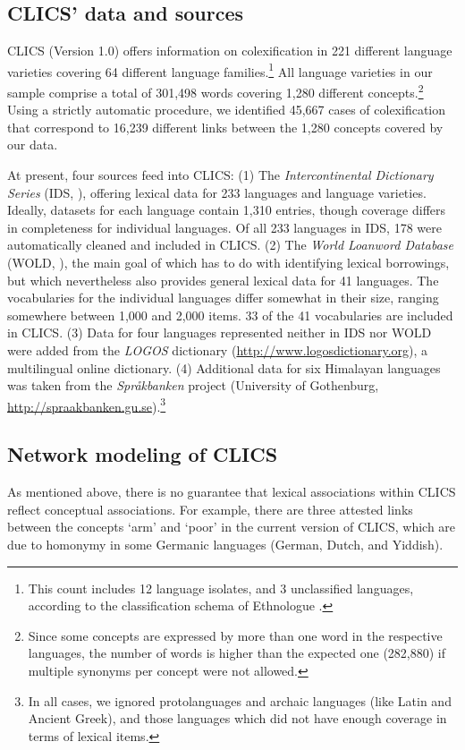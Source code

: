 \subsection{CLICS' data and sources}
CLICS (Version 1.0) offers information on colexification in 221 different language varieties
covering 64 different language families.\footnote{This count includes 12 language isolates, and 3
unclassified languages, according to the classification schema of Ethnologue \cite{Lewis2013}.} All language
varieties in our sample comprise a total of 301,498 words covering 1,280 different
concepts.\footnote{Since some concepts are expressed by more than one word in the respective
languages, the number of words is higher than the expected one (282,880) if multiple synonyms per
concept were not allowed.} Using a strictly automatic procedure, we identified 45,667 cases of
colexification that correspond to 16,239 different links between the 1,280 concepts covered by our
data. 

At present, four sources feed into CLICS: (1) The \emph{Intercontinental Dictionary Series} (IDS,
), offering lexical data for 233 languages and language varieties.
Ideally, datasets for each language contain 1,310 entries, though coverage differs in completeness
for individual languages. Of all 233 languages in IDS, 178 were automatically cleaned and included
in CLICS. (2) The \emph{World Loanword Database} (WOLD, ), the main goal
of which has to do with identifying lexical borrowings, but which nevertheless also provides general
lexical data for 41 languages. The vocabularies for the individual languages differ somewhat in
their size, ranging somewhere between 1,000 and 2,000 items. 33 of the 41 vocabularies are included
in CLICS.  (3) Data for four languages represented neither in IDS nor WOLD were added from the
\emph{LOGOS} dictionary (\url{http://www.logosdictionary.org}), a multilingual online dictionary.
(4) Additional data for six Himalayan languages was taken from the \emph{Spr\aa kbanken} project
(University of Gothenburg, \url{http://spraakbanken.gu.se}).\footnote{In all cases, we ignored
protolanguages and archaic languages (like Latin and Ancient Greek), and those languages which did not
have enough coverage in terms of lexical items.}

\subsection{Network modeling of CLICS}
As mentioned above, there is no guarantee that lexical associations within CLICS reflect conceptual
associations. For example, there are three attested links between the concepts `arm' and `poor' in
the current version of CLICS, which are due to homonymy in some Germanic languages (German, Dutch,
and Yiddish).
 
